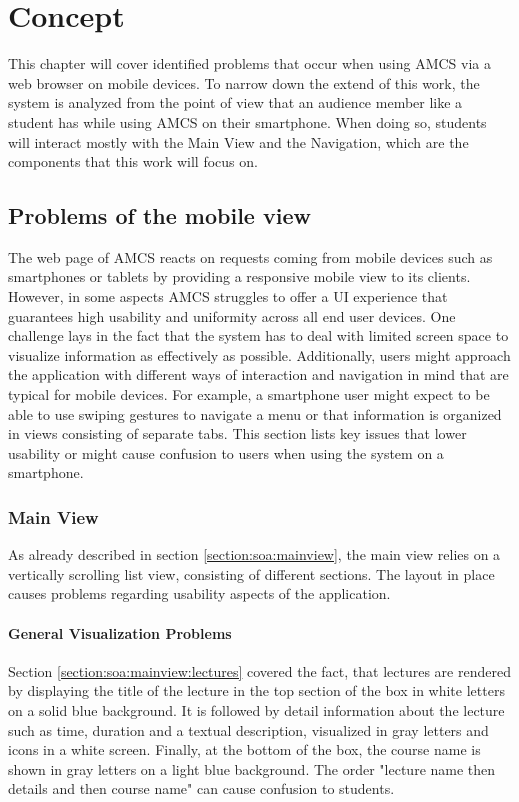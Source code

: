 \chapter{Concept}
\label{chapter:concept}
This chapter will cover identified problems that occur when using AMCS via a web browser on mobile
devices. To narrow down the extend of this work, the system is analyzed from the point of view that an audience member like a student has while using AMCS on their smartphone. When doing so, students will interact mostly with the Main View and the Navigation, which are the components that this work will focus on.

\section{Problems of the mobile view}
\label{section:con:problems}
The web page of AMCS reacts on requests coming from mobile devices such as smartphones or tablets by providing a responsive mobile view to its clients. However, in some aspects AMCS struggles to offer a UI experience that guarantees high usability and uniformity across all end user devices.
One challenge lays in the fact that the system has to deal with limited screen space to visualize information as effectively as possible. Additionally, users might approach the application with different ways of interaction and navigation in mind that are typical for mobile devices. For example, a smartphone user might expect to be able to use swiping gestures to navigate a menu or that information is organized in views consisting of separate tabs. This section lists key issues that lower usability or might cause confusion to users when using the system on a smartphone.

\subsection{Main View}
As already described in section \ref{section:soa:mainview}, the main view relies on a vertically scrolling list view, consisting of different sections. The layout in place causes problems regarding usability aspects of the application.

\subsubsection{General Visualization Problems}
\label{section:con:problems:mainview:generalvis}
Section \ref{section:soa:mainview:lectures} covered the fact, that lectures are rendered by displaying the title of the lecture in the top section of the box in white letters on a solid blue background. It is followed by detail information about the lecture such as time, duration and a textual description, visualized in gray letters and icons in a white screen. Finally, at the bottom of the box, the course name is shown in gray letters on a light blue background. The order "lecture name then details and then course name" can cause confusion to students.

